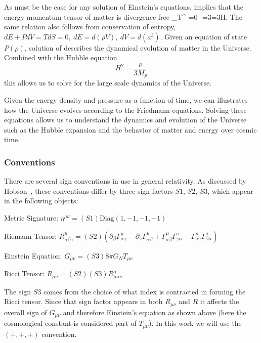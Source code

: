 As must be the case for any solution of Einstein's equations,  implies that the energy momentum tensor of matter is divergence free
\beqn\label{divTmn}
\nabla_\nu T^{\mu\nu} =0 \Rightarrow -=3=3H.
\eeqn
 The same relation also follows from conservation of entropy, $dE+PdV=TdS=0,\ dE=d(\rho V),\ dV=d(a^3)$. Given an equation of state $P(\rho)$, solution of  describes the dynamical evolution of matter in the Universe. Combined with the Hubble equation
\begin{equation}\label{Hubble_eq}
H^2=\frac{\rho}{3M_p}
\end{equation}
this allows us to solve for the large scale dynamics of the Universe. 

Given the energy density and pressure as a function of time, we can illustrates how the Universe evolves according to the Friedmann equations. Solving these equations allows us to understand the dynamics and evolution of the Universe such as the Hubble expansion and the behavior of matter and energy over cosmic time.

\subsubsection{Conventions}
\label{app:conventions}
There are several sign conventions in use in general relativity. As discussed by Hobson~\cite{hobson}, these conventions differ by three sign factors $S1$, $S2$, $S3$, which appear in the following objects:
\vspace{3mm}

Metric Signature: $\eta^{\mu\nu}=(S1)\text{Diag}(1,-1,-1,-1)$
\vspace{3mm}

Riemann Tensor: $R^\mu_{\alpha\beta\gamma}=(S2)(\partial_{\beta}\Gamma^\mu_{\alpha\gamma}-\partial_{\gamma}\Gamma^\mu_{\alpha\beta}+\Gamma^\mu_{\sigma\beta}\Gamma^\sigma_{\gamma\alpha}-\Gamma^\mu_{\sigma\gamma}\Gamma^\sigma_{\beta\alpha})$
\vspace{3mm}

Einstein Equation: $G_{\mu\nu}=(S3)8\pi G_NT_{\mu\nu}$
\vspace{3mm}

Ricci Tensor: $R_{\mu\nu}=(S2)(S3)R^\alpha_{\mu\alpha\nu}$
\vspace{3mm}

The sign $S3$ comes from the choice of what index is contracted in forming the Ricci tensor. Since that sign factor appears in both $R_{\mu\nu}$ and $R$ it affects the overall sign of $G_{\mu\nu}$ and therefore Einstein's equation as shown above (here the cosmological constant is considered part of $T_{\mu\nu}$). In this work we will use the $(+,+,+)$ convention.

